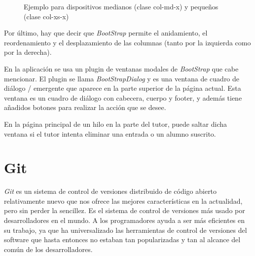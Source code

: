 \documentclass[a4paper, 12pt]{book}
\begin{document}
\begin{figure}[htbp] 
  \label{figura:bootstrap1}
  \centering
  \caption{Ejemplo para dispositivos medianos (clase col-md-x) y peque\~nos (clase col-xs-x)}
\end{figure}

Por \'ultimo, hay que decir que \textit{BootStrap} permite el anidamiento, el reordenamiento y el desplazamiento de las columnas 
(tanto por la izquierda como por la derecha).

En la aplicaci\'on se usa un plugin de ventanas modales de \textit{BootStrap} que cabe mencionar. El plugin se llama \textit{BootStrapDialog} y es una 
ventana de cuadro de di\'alogo / emergente 
que aparece en la parte superior de la p\'agina actual. Esta ventana es un cuadro de di\'alogo con cabecera, cuerpo y footer, y adem\'as tiene a\~nadidos 
botones para realizar la acci\'on que se desee. 

En la p\'agina principal de un hilo en la parte del tutor, puede saltar dicha ventana si el tutor intenta 
eliminar una entrada o un alumno suscrito.


\section{Git}
\label{sec:git}
\textit{Git} es un sistema de control de versiones distribuido de c\'odigo abierto relativamente nuevo que nos ofrece las mejores caracter\'isticas en la 
actualidad, pero sin perder la sencillez. Es el sistema de control de versiones m\'as usado por desarrolladores en el mundo. 
A los programadores ayuda a ser m\'as eficientes en su trabajo, ya que ha universalizado las herramientas de control de versiones del software que 
hasta entonces no estaban tan popularizadas y tan al alcance del com\'un de los desarrolladores.
\end{document}
